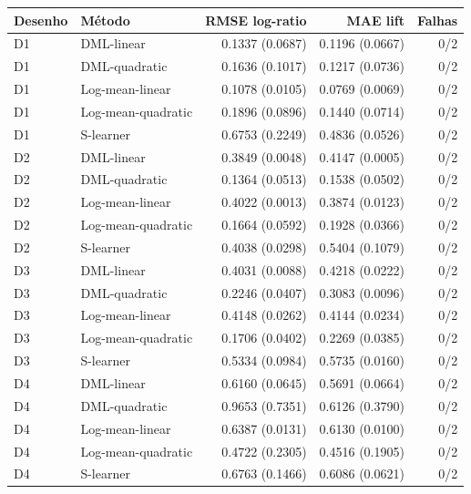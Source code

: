 \begin{tabular}{llrrr}
\toprule
Desenho & Método & RMSE log-ratio & MAE lift & Falhas \\
\midrule
D1 & DML-linear & 0.1337 (0.0687) & 0.1196 (0.0667) & 0/2 \\
D1 & DML-quadratic & 0.1636 (0.1017) & 0.1217 (0.0736) & 0/2 \\
D1 & Log-mean-linear & 0.1078 (0.0105) & 0.0769 (0.0069) & 0/2 \\
D1 & Log-mean-quadratic & 0.1896 (0.0896) & 0.1440 (0.0714) & 0/2 \\
D1 & S-learner & 0.6753 (0.2249) & 0.4836 (0.0526) & 0/2 \\
D2 & DML-linear & 0.3849 (0.0048) & 0.4147 (0.0005) & 0/2 \\
D2 & DML-quadratic & 0.1364 (0.0513) & 0.1538 (0.0502) & 0/2 \\
D2 & Log-mean-linear & 0.4022 (0.0013) & 0.3874 (0.0123) & 0/2 \\
D2 & Log-mean-quadratic & 0.1664 (0.0592) & 0.1928 (0.0366) & 0/2 \\
D2 & S-learner & 0.4038 (0.0298) & 0.5404 (0.1079) & 0/2 \\
D3 & DML-linear & 0.4031 (0.0088) & 0.4218 (0.0222) & 0/2 \\
D3 & DML-quadratic & 0.2246 (0.0407) & 0.3083 (0.0096) & 0/2 \\
D3 & Log-mean-linear & 0.4148 (0.0262) & 0.4144 (0.0234) & 0/2 \\
D3 & Log-mean-quadratic & 0.1706 (0.0402) & 0.2269 (0.0385) & 0/2 \\
D3 & S-learner & 0.5334 (0.0984) & 0.5735 (0.0160) & 0/2 \\
D4 & DML-linear & 0.6160 (0.0645) & 0.5691 (0.0664) & 0/2 \\
D4 & DML-quadratic & 0.9653 (0.7351) & 0.6126 (0.3790) & 0/2 \\
D4 & Log-mean-linear & 0.6387 (0.0131) & 0.6130 (0.0100) & 0/2 \\
D4 & Log-mean-quadratic & 0.4722 (0.2305) & 0.4516 (0.1905) & 0/2 \\
D4 & S-learner & 0.6763 (0.1466) & 0.6086 (0.0621) & 0/2 \\
\bottomrule
\end{tabular}
